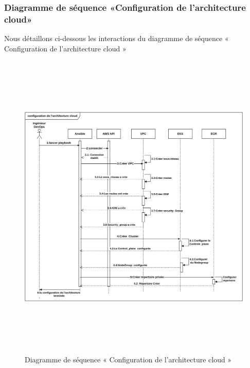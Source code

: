             \subsubsection{\selectfont{}Diagramme de séquence «Configuration de l'architecture cloud»}
            Nous détaillons ci-dessous les interactions du diagramme de séquence « Configuration de l'architecture cloud » 
            \begin{figure}[H]
                \begin{center}
                \includegraphics[height=15cm,width=18cm]{seqd.drawio.png}
                \end{center}
                \caption{Diagramme de séquence « Configuration de l'architecture cloud » }
                \end{figure}
